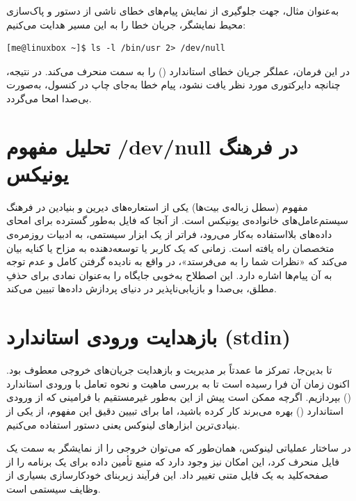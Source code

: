 به‌عنوان مثال، جهت جلوگیری از نمایش پیام‌های خطای ناشی از دستور  و پاک‌سازی محیط نمایشگر، جریان خطا را به این مسیر هدایت می‌کنیم:

\begin{latin}
\begin{lstlisting}
[me@linuxbox ~]$ ls -l /bin/usr 2> /dev/null
\end{lstlisting}
\end{latin}

در این فرمان، عملگر  جریان خطای استاندارد () را به سمت  منحرف می‌کند. در نتیجه، چنانچه دایرکتوری مورد نظر یافت نشود، پیام خطا به‌جای چاپ در کنسول، به‌صورت بی‌صدا امحا می‌گردد.

\section{تحلیل مفهوم /dev/null در فرهنگ یونیکس}

مفهوم  (سطل زباله‌ی بیت‌ها) یکی از استعاره‌های دیرین و بنیادین در فرهنگ سیستم‌عامل‌های خانواده‌ی یونیکس است. از آنجا که فایل  به‌طور گسترده برای امحای داده‌های بلااستفاده به‌کار می‌رود، فراتر از یک ابزار سیستمی، به ادبیات روزمره‌ی متخصصان راه یافته است. زمانی که یک کاربر یا توسعه‌دهنده به مزاح یا کنایه بیان می‌کند که «نظرات شما را به  می‌فرستد»، در واقع به نادیده گرفتن کامل و عدم توجه به آن پیام‌ها اشاره دارد. این اصطلاح به‌خوبی جایگاه  را به‌عنوان نمادی برای حذفِ مطلق، بی‌صدا و بازیابی‌ناپذیر در دنیای پردازش داده‌ها تبیین می‌کند.

\section{بازهدایت ورودی استاندارد (stdin)}

تا بدین‌جا، تمرکز ما عمدتاً بر مدیریت و بازهدایت جریان‌های خروجی معطوف بود. اکنون زمان آن فرا رسیده است تا به بررسی ماهیت و نحوه تعامل با ورودی استاندارد () بپردازیم. اگرچه ممکن است پیش از این به‌طور غیرمستقیم با فرامینی که از ورودی استاندارد () بهره می‌برند کار کرده باشید، اما برای تبیین دقیق این مفهوم، از یکی از بنیادی‌ترین ابزارهای لینوکس یعنی دستور  استفاده می‌کنیم.

در ساختار عملیاتی لینوکس، همان‌طور که می‌توان خروجی را از نمایشگر به سمت یک فایل منحرف کرد، این امکان نیز وجود دارد که منبع تأمین داده برای یک برنامه را از صفحه‌کلید به یک فایل متنی تغییر داد. این فرآیند زیربنای خودکارسازی بسیاری از وظایف سیستمی است.

